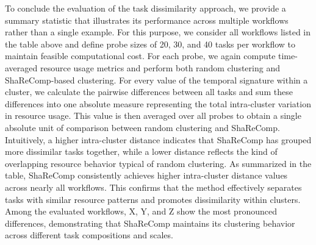 To conclude the evaluation of the task dissimilarity approach, we provide a summary statistic that illustrates its performance across multiple workflows rather than a single example. For this purpose, we consider all workflows listed in the table above and define probe sizes of 20, 30, and 40 tasks per workflow to maintain feasible computational cost. For each probe, we again compute time-averaged resource usage metrics and perform both random clustering and ShaReComp-based clustering.
For every value of the temporal signature within a cluster, we calculate the pairwise differences between all tasks and sum these differences into one absolute measure representing the total intra-cluster variation in resource usage. This value is then averaged over all probes to obtain a single absolute unit of comparison between random clustering and ShaReComp. Intuitively, a higher intra-cluster distance indicates that ShaReComp has grouped more dissimilar tasks together, while a lower distance reflects the kind of overlapping resource behavior typical of random clustering.
As summarized in the table, ShaReComp consistently achieves higher intra-cluster distance values across nearly all workflows. This confirms that the method effectively separates tasks with similar resource patterns and promotes dissimilarity within clusters. Among the evaluated workflows, X, Y, and Z show the most pronounced differences, demonstrating that ShaReComp maintains its clustering behavior across different task compositions and scales.

